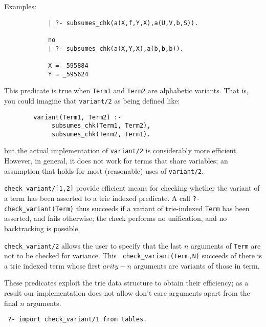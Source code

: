 \begin{description}
    Examples:
    {\footnotesize
     \begin{verbatim}
            | ?- subsumes_chk(a(X,f,Y,X),a(U,V,b,S)).

            no
            | ?- subsumes_chk(a(X,Y,X),a(b,b,b)).

            X = _595884
            Y = _595624
     \end{verbatim}}

    This predicate is true when {\tt Term1} and {\tt Term2} are 
    alphabetic variants.  That is, you could imagine that {\tt variant/2}
    as being defined like:
    \begin{center}
    \begin{minipage}{3.5in}
    \begin{verbatim}
        variant(Term1, Term2) :-
             subsumes_chk(Term1, Term2),
             subsumes_chk(Term2, Term1).
    \end{verbatim}
    \end{minipage}
    \end{center}
    but the actual implementation of {\tt variant/2} is considerably more
    efficient.  However, in general, it does not work for terms that share
    variables; an assumption that holds for most (reasonable) uses of
    {\tt variant/2}.

%
 {\tt check\_variant/[1,2]} provide efficient means for checking
 whether the variant of a term has been asserted to a trie indexed
 predicate.  A call {\tt ?- check\_variant(Term)} thus succeeds if a
 variant of trie-indexed {\tt Term} has been asserted, and fails
 otherwise; the check performs no unification, and no backtracking is
 possible.

{\tt check\_variant/2} allows the user to specify that the last $n$
arguments of {\tt Term} are not to be checked for variance.  This {\tt
  check\_variant(Term,N)} succeeds of there is a trie indexed term
whose first $arity - n$ arguments are variants of those in term.

These predicates exploit the trie data structure to obtain their
efficiency; as a result our implementation does not allow don't care
arguments apart from the final $n$ arguments.  

%
\begin{example}
\begin{small}
\begin{verbatim}
 ?- import check_variant/1 from tables.


\end{verbatim}
\end{small}
\end{example}
\end{description}
